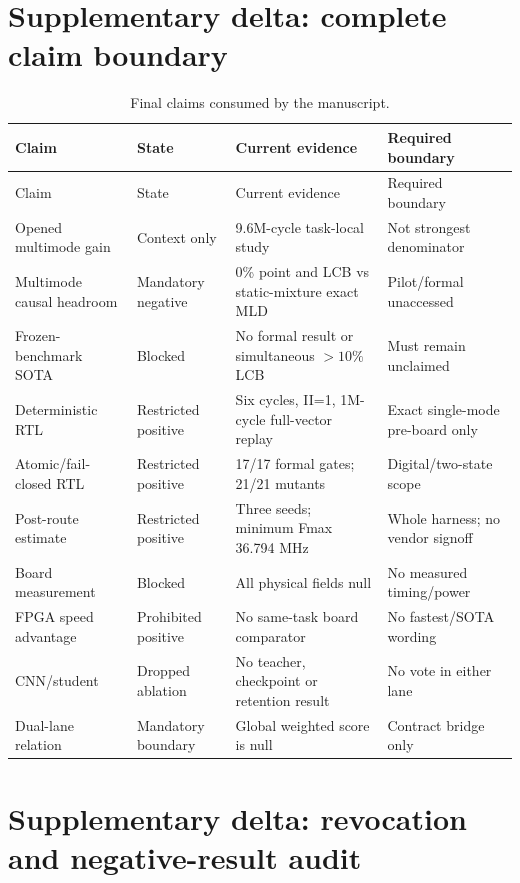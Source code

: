 \documentclass[11pt]{article}
\begin{document}
\section{Supplementary delta: complete claim boundary}

\begin{longtable}{@{}L{0.22\textwidth} L{0.16\textwidth} L{0.23\textwidth} L{0.31\textwidth}@{}}
\caption{Final claims consumed by the manuscript.}\label{tab:claims}\\
\toprule
Claim & State & Current evidence & Required boundary \\
\midrule
\endfirsthead
\toprule
Claim & State & Current evidence & Required boundary \\
\midrule
\endhead
Opened multimode gain & Context only & 9.6M-cycle task-local study & Not strongest denominator \\
Multimode causal headroom & Mandatory negative & 0\% point and LCB vs static-mixture exact MLD & Pilot/formal unaccessed \\
Frozen-benchmark SOTA & Blocked & No formal result or simultaneous $>10\%$ LCB & Must remain unclaimed \\
Deterministic RTL & Restricted positive & Six cycles, II=1, 1M-cycle full-vector replay & Exact single-mode pre-board only \\
Atomic/fail-closed RTL & Restricted positive & 17/17 formal gates; 21/21 mutants & Digital/two-state scope \\
Post-route estimate & Restricted positive & Three seeds; minimum Fmax 36.794 MHz & Whole harness; no vendor signoff \\
Board measurement & Blocked & All physical fields null & No measured timing/power \\
FPGA speed advantage & Prohibited positive & No same-task board comparator & No fastest/SOTA wording \\
CNN/student & Dropped ablation & No teacher, checkpoint or retention result & No vote in either lane \\
Dual-lane relation & Mandatory boundary & Global weighted score is null & Contract bridge only \\
\bottomrule
\end{longtable}

\section{Supplementary delta: revocation and negative-result audit}
\end{document}

